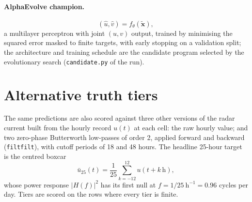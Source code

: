 \documentclass[11pt]{article}
\begin{document}
\paragraph{AlphaEvolve champion.}
\begin{equation}
(\hat u, \hat v) = f_{\theta}(\tilde{\mathbf{x}}),
\label{eq:champion}
\end{equation}
a multilayer perceptron with joint $(u,v)$ output, trained by minimising the
squared error masked to finite targets, with early stopping on a validation
split; the architecture and training schedule are the candidate program
selected by the evolutionary search (\texttt{candidate.py} of the run).

\section{Alternative truth tiers}

The same predictions are also scored against three other versions of the
radar current built from the hourly record $u(t)$ at each cell: the raw hourly
value; and two zero-phase Butterworth low-passes of order 2, applied forward
and backward (\texttt{filtfilt}), with cutoff periods of 18 and 48 hours. The
headline 25-hour target is the centred boxcar
\begin{equation}
\bar u_{25}(t) = \frac{1}{25}\sum_{k=-12}^{12} u(t + k\,\text{h}),
\label{eq:boxcar}
\end{equation}
whose power response $|H(f)|^2$ has its first null at $f = 1/25\ \text{h}^{-1}
= 0.96$ cycles per day. Tiers are scored on the rows where every tier is
finite.

\end{document}
